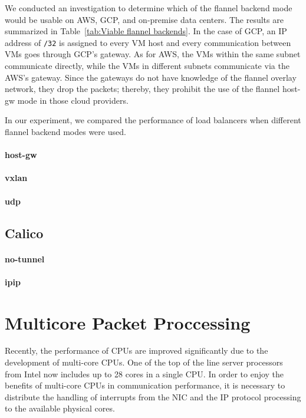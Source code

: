 We conducted an investigation to determine which of the flannel backend mode would be usable on AWS, GCP, and on-premise data centers.
The results are summarized in Table~\ref{tab:Viable flannel backends}. 
In the case of GCP, an IP address of {\tt /32} is assigned to every VM host and 
every communication between VMs goes through GCP's gateway.
As for AWS, the VMs within the same subnet communicate directly, while the VMs in different subnets communicate via the AWS's gateway.
Since the  gateways do not have knowledge of the flannel overlay network, they drop the packets; thereby, 
they prohibit the use of the flannel host-gw mode in those cloud providers.  

In our experiment, we compared the performance of load balancers when different flannel backend modes were used. 

\paragraph{\bf host-gw}
\paragraph{\bf vxlan}
\paragraph{\bf udp}

\subsection{Calico}
\paragraph{\bf no-tunnel}
\paragraph{\bf ipip}

\section{Multicore Packet Proccessing}

Recently, the performance of CPUs are improved significantly due to the development of multi-core CPUs.
One of the top of the line server processors from Intel now includes up to 28 cores in a single CPU.
In order to enjoy the benefits of multi-core CPUs in communication performance, 
it is necessary to distribute the handling of interrupts from the NIC and the IP protocol processing to the available physical cores.

